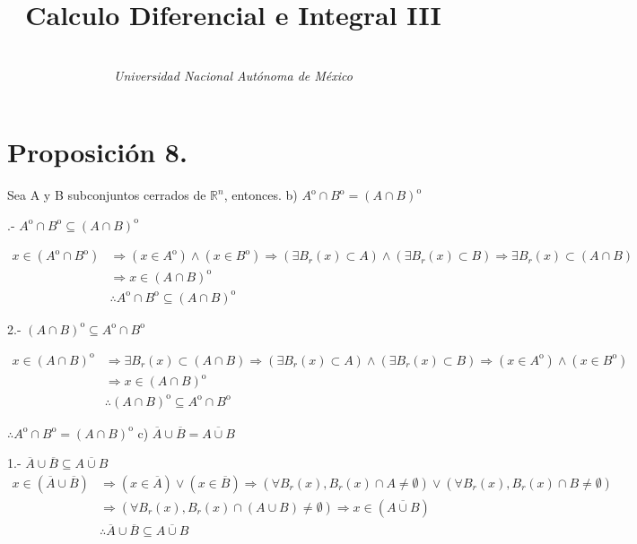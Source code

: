 \documentclass[secnumarabic,balancelastpage,amsmath,amssymb]{article}
\begin{document}
\title{\vspace{-15mm}\textbf{Calculo Diferencial e Integral III}}
\author{\\ \emph{Universidad Nacional Autónoma de México }}

\section{Proposición 8.}
Sea A y B subconjuntos cerrados de $\mathbb {R}^{n}$, entonces.
b) $A^{\mathrm{o}} \cap B^{\mathrm{o}} =  (A \cap B)^{\mathrm{o}}$ 

.- $A^{\mathrm{o}} \cap B^{\mathrm{o}} \subseteq (A \cap B)^{\mathrm{o}} $


\begin{equation}
\begin{aligned}
x \in (A^{\mathrm{o}} \cap B^{\mathrm{o}}) &\Rightarrow   (x \in A^{\mathrm{o}}) \land  (x \in B^{\mathrm{o}}) \Rightarrow (\exists B_r(x) \subset A) \land (\exists B_r(x) \subset B) \Rightarrow \exists B_r(x) \subset (A\cap B) \\
& \Rightarrow x \in (A \cap B)^{\mathrm{o}} \\
& \therefore A^{\mathrm{o}} \cap B^{\mathrm{o}} \subseteq (A \cap B)^{\mathrm{o}}
\end{aligned}
\end{equation}


2.- $ (A \cap B)^{\mathrm{o}} \subseteq A^{\mathrm{o}} \cap B^{\mathrm{o}} $

\begin{equation}
\begin{aligned}
x \in (A \cap B)^{\mathrm{o}} & \Rightarrow \exists B_r(x) \subset (A \cap B) \Rightarrow (\exists B_r(x) \subset A) \land (\exists B_r(x) \subset B) \Rightarrow (x \in A^{\mathrm{o}})\land(x \in B^{\mathrm{o}}) \\
& \Rightarrow x\in (A \cap B)^{\mathrm{o}} \\
& \therefore  (A \cap B)^{\mathrm{o}} \subseteq A^{\mathrm{o}} \cap B^{\mathrm{o}}
\end{aligned}
\end{equation}

$\therefore  A^{\mathrm{o}} \cap B^{\mathrm{o}} =  (A \cap B)^{\mathrm{o}}$
c) $\overline{A} \cup \overline{B} = \overline{A \cup B}$ 

1.- $\overline{A} \cup \overline{B} \subseteq \overline{A \cup B}$
\begin{equation}
\begin{aligned}
x \in  (\overline{A} \cup \overline{B} ) &\Rightarrow (x \in \overline{A}) \lor (x \in \overline{B}) \Rightarrow (\forall B_r(x), B_r(x) \cap A \neq \emptyset) \lor (\forall B_r(x), B_r(x) \cap B \neq \emptyset) \\
& \Rightarrow (\forall B_r(x), B_r(x) \cap (A \cup B) \neq \emptyset) \Rightarrow x \in (\overline{A \cup B}) \\
& \therefore \overline{A} \cup \overline{B} \subseteq \overline{A \cup B}
\end{aligned}
\end{equation}
\end{document}

